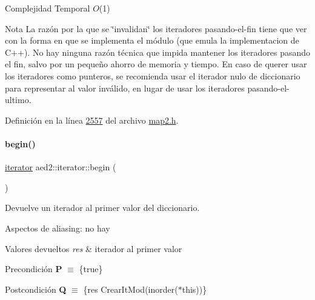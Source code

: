 \begin{DoxyDescription}
\item[Complejidad Temporal]$O$(1)
\end{DoxyDescription}

\begin{DoxyNote}{Nota}
La razón por la que se \char`\"{}invalidan\char`\"{} los iteradores pasando-\/el-\/fin tiene que ver con la forma en que se implementa el módulo (que emula la implementacion de C++). No hay ninguna razón técnica que impida mantener los iteradores pasando el fin, salvo por un pequeño ahorro de memoria y tiempo. En caso de querer usar los iteradores como punteros, se recomienda usar el iterador nulo de diccionario para representar al valor inválido, en lugar de usar los iteradores pasando-\/el-\/ultimo. 
\end{DoxyNote}


Definición en la línea \hyperlink{map2_8h_source_l02557}{2557} del archivo \hyperlink{map2_8h_source}{map2.\+h}.

\mbox{\label{classaed2_1_1iterator_af8901de173468531c58458b581d345a6_af8901de173468531c58458b581d345a6}} 
\paragraph{\texorpdfstring{begin()}{begin()}\hspace{0.1cm}{\footnotesize\ttfamily [1/2]}}
{\footnotesize\ttfamily \hyperlink{classaed2_1_1iterator_1_1iterator}{iterator} aed2\+::iterator\+::begin (\begin{DoxyParamCaption}{ }\end{DoxyParamCaption})\hspace{0.3cm}{\ttfamily [inline]}}



Devuelve un iterador al primer valor del diccionario. 

\begin{DoxyParagraph}{Aspectos de aliasing\+:}
no hay
\end{DoxyParagraph}

\begin{DoxyRetVals}{Valores devueltos}
{\em res} & iterador al primer valor\\
\hline
\end{DoxyRetVals}
\begin{DoxyPrecond}{Precondición}
{\bfseries P} $\equiv$ \{true\} 
\end{DoxyPrecond}
\begin{DoxyPostcond}{Postcondición}
{\bfseries Q} $\equiv$ \{res  Crear\+It\+Mod(inorder($\ast$this))\}
\end{DoxyPostcond}

